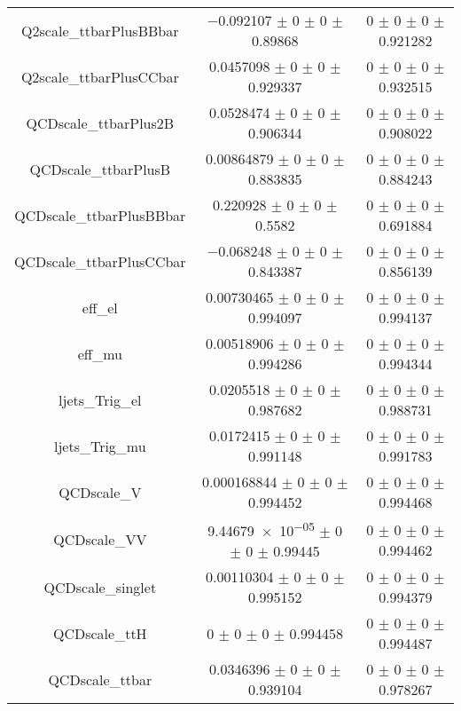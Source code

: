 \begin{table}
\begin{tabular}{ccc}
Q2scale\_ttbarPlusBBbar & \num{-0.092107} $\pm$ \num{0} $\pm$ \num{0} $\pm$ \num{0.89868} & \num{0} $\pm$ \num{0} $\pm$ \num{0} $\pm$ \num{0.921282}\\
Q2scale\_ttbarPlusCCbar & \num{0.0457098} $\pm$ \num{0} $\pm$ \num{0} $\pm$ \num{0.929337} & \num{0} $\pm$ \num{0} $\pm$ \num{0} $\pm$ \num{0.932515}\\
QCDscale\_ttbarPlus2B & \num{0.0528474} $\pm$ \num{0} $\pm$ \num{0} $\pm$ \num{0.906344} & \num{0} $\pm$ \num{0} $\pm$ \num{0} $\pm$ \num{0.908022}\\
QCDscale\_ttbarPlusB & \num{0.00864879} $\pm$ \num{0} $\pm$ \num{0} $\pm$ \num{0.883835} & \num{0} $\pm$ \num{0} $\pm$ \num{0} $\pm$ \num{0.884243}\\
QCDscale\_ttbarPlusBBbar & \num{0.220928} $\pm$ \num{0} $\pm$ \num{0} $\pm$ \num{0.5582} & \num{0} $\pm$ \num{0} $\pm$ \num{0} $\pm$ \num{0.691884}\\
QCDscale\_ttbarPlusCCbar & \num{-0.068248} $\pm$ \num{0} $\pm$ \num{0} $\pm$ \num{0.843387} & \num{0} $\pm$ \num{0} $\pm$ \num{0} $\pm$ \num{0.856139}\\
eff\_el & \num{0.00730465} $\pm$ \num{0} $\pm$ \num{0} $\pm$ \num{0.994097} & \num{0} $\pm$ \num{0} $\pm$ \num{0} $\pm$ \num{0.994137}\\
eff\_mu & \num{0.00518906} $\pm$ \num{0} $\pm$ \num{0} $\pm$ \num{0.994286} & \num{0} $\pm$ \num{0} $\pm$ \num{0} $\pm$ \num{0.994344}\\
ljets\_Trig\_el & \num{0.0205518} $\pm$ \num{0} $\pm$ \num{0} $\pm$ \num{0.987682} & \num{0} $\pm$ \num{0} $\pm$ \num{0} $\pm$ \num{0.988731}\\
ljets\_Trig\_mu & \num{0.0172415} $\pm$ \num{0} $\pm$ \num{0} $\pm$ \num{0.991148} & \num{0} $\pm$ \num{0} $\pm$ \num{0} $\pm$ \num{0.991783}\\
QCDscale\_V & \num{0.000168844} $\pm$ \num{0} $\pm$ \num{0} $\pm$ \num{0.994452} & \num{0} $\pm$ \num{0} $\pm$ \num{0} $\pm$ \num{0.994468}\\
QCDscale\_VV & \num{9.44679e-05} $\pm$ \num{0} $\pm$ \num{0} $\pm$ \num{0.99445} & \num{0} $\pm$ \num{0} $\pm$ \num{0} $\pm$ \num{0.994462}\\
QCDscale\_singlet & \num{0.00110304} $\pm$ \num{0} $\pm$ \num{0} $\pm$ \num{0.995152} & \num{0} $\pm$ \num{0} $\pm$ \num{0} $\pm$ \num{0.994379}\\
QCDscale\_ttH & \num{0} $\pm$ \num{0} $\pm$ \num{0} $\pm$ \num{0.994458} & \num{0} $\pm$ \num{0} $\pm$ \num{0} $\pm$ \num{0.994487}\\
QCDscale\_ttbar & \num{0.0346396} $\pm$ \num{0} $\pm$ \num{0} $\pm$ \num{0.939104} & \num{0} $\pm$ \num{0} $\pm$ \num{0} $\pm$ \num{0.978267}\\

\end{tabular}
\end{table}
